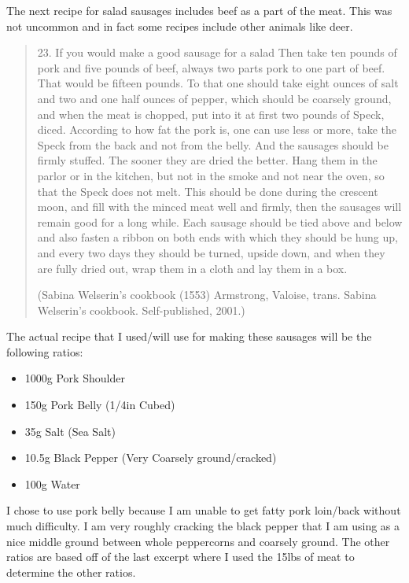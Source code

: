\documentclass[letterpaper,11pt,leqno]{article}
\begin{document}
The next recipe for salad sausages includes beef as a part of the meat. This was not uncommon and in fact some recipes include other animals like deer.

\begin{quote}
	23.  If you would make a good sausage for a salad
	Then take ten pounds of pork and five pounds of beef, always two parts pork to one part of beef.  That would be fifteen pounds.  To that one should take eight ounces of salt and two and one half ounces of pepper, which should be coarsely ground, and when the meat is chopped, put into it at first two pounds of Speck, diced.  According to how fat the pork is, one can use less or more, take the Speck from the back and not from the belly.  And the sausages should be firmly stuffed.  The sooner they are dried the better.  Hang them in the parlor or in the kitchen, but not in the smoke and not near the oven, so that the Speck does not melt.  This should be done during the crescent moon, and fill with the minced meat well and firmly, then the sausages will remain good for a long while.  Each sausage should be tied above and below and also fasten a ribbon on both ends with which they should be hung up, and every two days they should be turned, upside down, and when they are fully dried out, wrap them in a cloth and lay them in a box.
	
	(Sabina Welserin’s cookbook (1553) Armstrong, Valoise, trans.  Sabina Welserin’s cookbook.  Self-published, 2001.)
\end{quote}

The actual recipe that I used/will use for making these sausages will be the following ratios:

\begin{itemize}
	\item 1000g Pork Shoulder
	\item 150g Pork Belly (1/4in Cubed)
	\item 35g Salt (Sea Salt)
	\item 10.5g Black Pepper (Very Coarsely ground/cracked)
	\item 100g Water
\end{itemize}

I chose to use pork belly because I am unable to get fatty pork loin/back without much difficulty. I am very roughly cracking the black pepper that I am using as a nice middle ground between whole peppercorns and coarsely ground. The other ratios are based off of the last excerpt where I used the 15lbs of meat to determine the other ratios.
\end{document}
